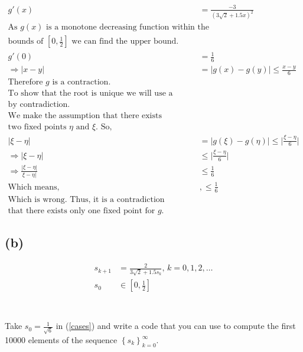 \documentclass{article}
\begin{document}
\begin{align*}
    g'(x) &= \frac{-3}{(3\sqrt{2}+1.5x)^2}\\
    \text{As $g(x)$ is a monotone decreasing function within the}&\\
    \text{bounds of $\left[0, \frac{1}{2}\right]$ we can find the upper bound.}&\\
    g'(0)&= \frac{1}{6}\\
    \Rightarrow |x-y|&= |g(x)-g(y)| \le \frac{x-y}{6}\\
    \text{Therefore $g$ is a contraction.}&\\
    \text{To show that the root is unique we will use a proof}&\\
    \text{by contradiction.}&\\
    \text{We make the assumption that there exists}&\\
    \text{two fixed points $\eta$ and $\xi$. So,}&\\
    |\xi - \eta|&= |g(\xi)-g(\eta)|\le \bigg | \frac{\xi - \eta}{6}\bigg |\\
    \Rightarrow |\xi - \eta|& \le \bigg | \frac{\xi - \eta}{6}\bigg |\\
    \Rightarrow \frac{| \xi - \eta|}{\xi - \eta|}& \le \frac{1}{6}\\
    \text{Which means, }&, \le \frac{1}{6}\\
    \text{Which is wrong. Thus, it is a contradiction meaning}&\\
    \text{that there exists only one fixed point for $g$.}
\end{align*}

\vspace{10mm}
\subsection*{(b)}

\begin{align*}
     s_{k+1} &= \frac{2}{3\sqrt{2}+1.5s_k} \text{, }k=0,1,2,\dots\\
     s_0 &\in \left[0, \frac{1}{2} \right]\\
\end{align*}



\section{}
Take $s_0 = \frac{1}{\sqrt{6}}$ in (\ref{cases}) and write a code that you can use to compute the first 10000 elements of the sequence $\left\{ s_k \right\}^{\infty}_{k=0}$.
\vspace{10mm}
\end{document}
